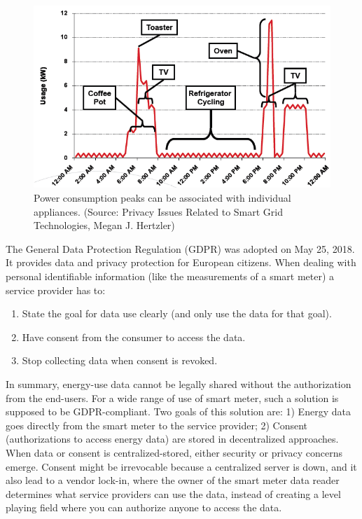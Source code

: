 \documentclass[journal,article,applsci,submit,moreauthors,pdftex]{Definitions/mdpi}
\begin{document}
\begin{figure}[h]
    \centering
    \includegraphics[width=4.5 in]{power_usage}
    \caption{Power consumption peaks can be associated with individual appliances. (Source: Privacy Issues Related to Smart Grid Technologies, Megan J. Hertzler)}
    \label{fig:power_usage}
\end{figure}

The General Data Protection Regulation (GDPR) was adopted on May 25, 2018. It provides data and privacy protection for European citizens. When dealing with personal identifiable information (like the measurements of a smart meter) a service provider has to:
\begin{enumerate}[leftmargin=*,labelsep=4.9mm]
    \item State the goal for data use clearly (and only use the data for that goal).
    \item Have consent from the consumer to access the data.
    \item Stop collecting data when consent is revoked.
\end{enumerate}

In summary, energy-use data cannot be legally shared without the authorization from the end-users. For a wide range of use of smart meter, such a solution is supposed to be GDPR-compliant. Two goals of this solution are: 1) Energy data goes directly from the smart meter to the service provider; 2) Consent (authorizations to access energy data) are stored in decentralized approaches. When data or consent is centralized-stored, either security or privacy concerns emerge. Consent might be irrevocable because a centralized server is down, and it also lead to a vendor lock-in, where the owner of the smart meter data reader determines what service providers can use the data, instead of creating a level playing field where you can authorize anyone to access the data.
\end{document}
